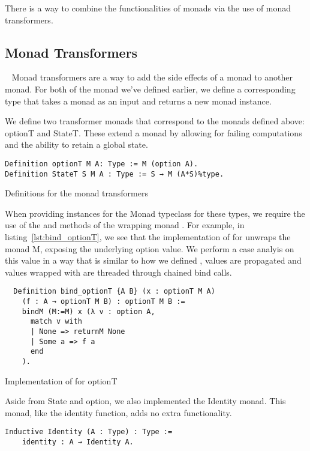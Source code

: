 There is a way to combine the functionalities of monads via the use of monad
transformers. 

\subsection{Monad Transformers}~\label{sec:monad_transformers}
Monad transformers\cite{liang1995monad} are a way to add the side effects of a
monad to another monad. For both of the monad we've defined earlier, we define
a corresponding type that takes a monad as an input and returns a new monad
instance.

We define two transformer monads that correspond to the monads defined above:
optionT and StateT. These extend a monad by allowing for failing computations
and the ability to retain a global state. 

\begin{listing}
\begin{verbatim}
Definition optionT M A: Type := M (option A).
Definition StateT S M A : Type := S → M (A*S)%type.
\end{verbatim}
\caption{Definitions for the monad transformers}
\end{listing}

When providing instances for the Monad typeclass for these types, we require
the use of the  and  methods of the wrapping monad
.
For example, in listing~\ref{lst:bind_optionT}, we see that the implementation 
of  for 
unwraps the monad M, exposing the underlying option value. We perform a case
analyis on this value in a way that is similar to how we defined
,
 values are propagated and values wrapped with  are 
threaded through chained bind calls.

\begin{listing}
\begin{verbatim}
  Definition bind_optionT {A B} (x : optionT M A) 
    (f : A → optionT M B) : optionT M B :=
    bindM (M:=M) x (λ v : option A,
      match v with
      | None => returnM None
      | Some a => f a
      end
    ).
\end{verbatim}
\caption{Implementation of \coq{>>= } for optionT}
\label{lst:bind_optionT}
\end{listing}

Aside from State and option, we also implemented the Identity monad. This monad,
like the identity function, adds no extra functionality. 
\begin{verbatim}
Inductive Identity (A : Type) : Type := 
    identity : A → Identity A.
\end{verbatim}

